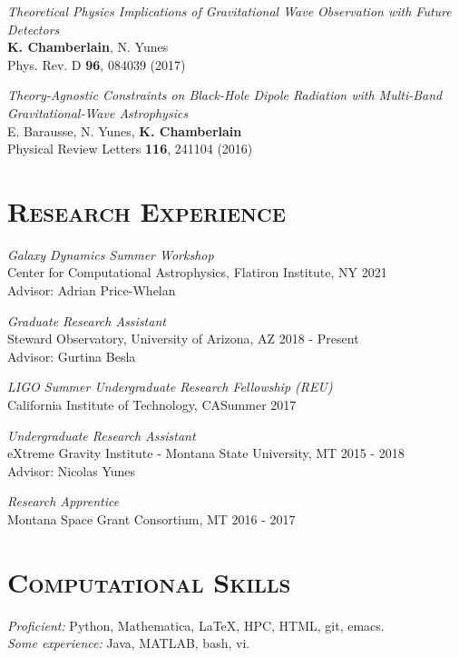 \documentclass[margin]{res}
\begin{document}
\begin{resume}
\emph{Theoretical Physics Implications of Gravitational Wave Observation 
         with Future\\ Detectors}\\
\textbf{K. Chamberlain}, N. Yunes\\
Phys. Rev. D \textbf{96}, 084039 (2017)

\emph{Theory-Agnostic Constraints on Black-Hole Dipole Radiation with  
         Multi-Band Gravitational-Wave Astrophysics}\\
E. Barausse, N. Yunes,  \textbf{K. Chamberlain}  \\
Physical Review Letters \textbf{116}, 241104 (2016)
\smallskip


 
\section{\textsc{Research Experience}}
	{\sl Galaxy Dynamics Summer Workshop} \\
	Center for Computational Astrophysics, Flatiron Institute, NY \hfill 2021\\
	Advisor: Adrian Price-Whelan

	{\sl Graduate Research Assistant} \\
	Steward Observatory, University of Arizona, AZ \hfill 2018 - Present\\
	Advisor: Gurtina Besla

	{\sl LIGO Summer Undergraduate Research Fellowship (REU)} \\
	California Institute of Technology, CA\hfill Summer 2017

	{\sl Undergraduate Research Assistant} \\
	eXtreme Gravity Institute - Montana State University, MT \hfill 2015 - 2018\\
	Advisor: Nicolas Yunes
	
	{\sl Research Apprentice} \\
	Montana Space Grant Consortium, MT \hfill 2016 - 2017

 \medskip
\section{\textsc{Computational Skills}}
\emph{Proficient:} Python, Mathematica, LaTeX, HPC, HTML, git, emacs. \\
\emph{Some experience:} Java, MATLAB, bash, vi. \\



\end{resume}
\end{document}

